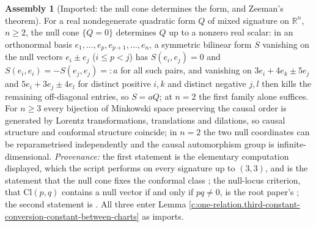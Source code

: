 \documentclass[11pt]{article}
\theoremstyle{definition}
\newtheorem{assembled}[theorem]{Assembly}
\theoremstyle{plain}
\newcommand{\changedmark}[2]{\marginpar{\raggedright\scriptsize\color{#1}#2}}
\providecommand{\Cl}{}\renewcommand{\Cl}{\mathrm{Cl}}
\providecommand{\R}{}\renewcommand{\R}{\mathbb{R}}
\begin{document}
\begin{assembled}[Imported: the null cone determines the form, and Zeeman's theorem]\label{c:one-relation.imported-null-cone-determines-form-zeemans}
\changedmark{gray}{reworded}
For a real nondegenerate quadratic form $Q$ of mixed signature on $\R^{n}$, $n \geq 2$, the null cone $\{Q = 0\}$ determines $Q$ up to a nonzero real scalar: in an orthonormal basis $e_{1}, \dots, e_{p}, e_{p+1}, \dots, e_{n}$, a symmetric bilinear form $S$ vanishing on the null vectors $e_{i} \pm e_{j}$ ($i \leq p < j$) has $S(e_{i}, e_{j}) = 0$ and $S(e_{i}, e_{i}) = -S(e_{j}, e_{j}) =: a$ for all such pairs, and vanishing on $3e_{i} + 4e_{k} \pm 5e_{j}$ and $5e_{i} + 3e_{j} \pm 4e_{l}$ for distinct positive $i, k$ and distinct negative $j, l$ then kills the remaining off-diagonal entries, so $S = aQ$; at $n = 2$ the first family alone suffices. For $n \geq 3$ every bijection of Minkowski space preserving the causal order is generated by Lorentz transformations, translations and dilations, so causal structure and conformal structure coincide; in $n = 2$ the two null coordinates can be reparametrised independently and the causal automorphism group is infinite-dimensional. \emph{Provenance:} the first statement is the elementary computation displayed, which the script performs on every signature up to $(3,3)$, and is the statement that the null cone fixes the conformal class \cite{HawkingEllis1973}; the null-locus criterion, that $\Cl(p,q)$ contains a null vector if and only if $pq \neq 0$, is the root paper's \cite[Prop.~3.3]{ButlerT1}; the second statement is \cite{Zeeman1964}. All three enter Lemma \ref{c:one-relation.third-constant-conversion-constant-between-charts} as imports.
\end{assembled}
\end{document}
